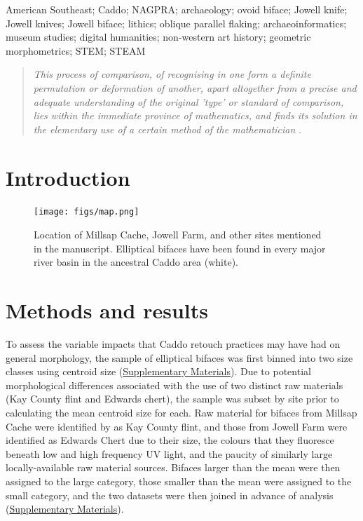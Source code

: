 \documentclass[]{interact}
\theoremstyle{plain}%
\theoremstyle{definition}
\theoremstyle{remark}
\begin{document}
\begin{keywords}
American Southeast; Caddo; NAGPRA; archaeology; ovoid biface; Jowell
knife; Jowell knives; Jowell biface; lithics; oblique parallel flaking;
archaeoinformatics; museum studies; digital humanities; non-western art
history; geometric morphometrics; STEM; STEAM
\end{keywords}

\begin{quote}
\textit{This process of comparison, of recognising in one form a definite permutation or deformation of another, apart altogether from a precise and adequate understanding of the original 'type' or standard of comparison, lies within the immediate province of mathematics, and finds its solution in the elementary use of a certain method of the mathematician} \citep{RN7522}.
\end{quote}

\hypertarget{introduction}{%
\section{Introduction}\label{introduction}}

\begin{figure}\centering
\texttt{[image: figs/map.png]}
\caption{Location of Millsap Cache, Jowell Farm, and other sites mentioned in the manuscript. Elliptical bifaces have been found in every major river basin in the ancestral Caddo area (white).}
\label{fig:map}
\end{figure}

\hypertarget{methods-and-results}{%
\section{Methods and results}\label{methods-and-results}}

To assess the variable impacts that Caddo retouch practices may have had
on general morphology, the sample of elliptical bifaces was first binned
into two size classes using centroid size
(\href{https://seldenlab.github.io/elliptical.bifaces/}{Supplementary
Materials}). Due to potential morphological differences associated with
the use of two distinct raw materials (Kay County flint and Edwards
chert), the sample was subset by site prior to calculating the mean
centroid size for each. Raw material for bifaces from Millsap Cache were
identified by \citet{RN11461} as Kay County flint, and those from Jowell
Farm were identified as Edwards Chert due to their size, the colours
that they fluoresce beneath low and high frequency UV light, and the
paucity of similarly large locally-available raw material sources.
Bifaces larger than the mean were then assigned to the large category,
those smaller than the mean were assigned to the small category, and the
two datasets were then joined in advance of analysis
(\href{https://seldenlab.github.io/elliptical.bifaces/}{Supplementary
Materials}).
\end{document}
